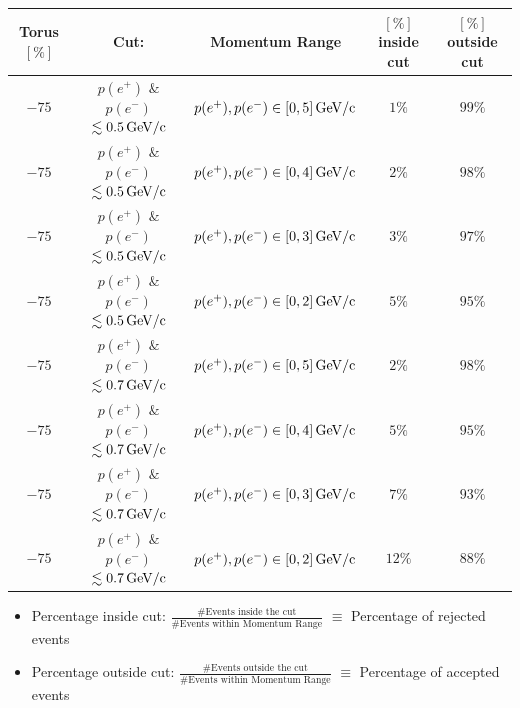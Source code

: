 \documentclass[xcolor=table, xcolor=dvipsnames]{beamer}
\begin{document}
\begin{frame}  
        \tiny
        \begin{table}
          \begin{tabular}{|c||c||c||c||c|}
             \hline
               Torus $[\%]$ & Cut: &  Momentum Range & $[\%]$ inside cut  & $[\%]$ outside cut \\
               \hline
               \hline
               $-75$ & $p(e^+)$ $\&$ $p(e^-)$ $ \lesssim 0.5\,\rm{GeV/c}$ & $p(e^+),p(e^-) \in [0,5] \,\rm{GeV/c}$  & $1\%$ & $99\%$\\
               \hline
                $-75$ & $p(e^+)$ $\&$ $p(e^-)$ $ \lesssim 0.5\,\rm{GeV/c}$ & $p(e^+),p(e^-) \in [0,4] \,\rm{GeV/c}$  & $2\%$ & $98\%$\\
                \hline
                 $-75$ & $p(e^+)$ $\&$ $p(e^-)$ $ \lesssim 0.5\,\rm{GeV/c}$ & $p(e^+),p(e^-) \in [0,3] \,\rm{GeV/c}$  & $3\%$ & $97\%$\\
                \hline
               $-75$ & $p(e^+)$ $\&$ $p(e^-)$ $ \lesssim 0.5\,\rm{GeV/c}$ & $p(e^+),p(e^-) \in [0,2] \,\rm{GeV/c}$  & $5\%$ & $95\%$\\
                \hline
                \hline
               $-75$ & $p(e^+)$ $\&$ $p(e^-)$ $ \lesssim 0.7\,\rm{GeV/c}$ & $p(e^+),p(e^-) \in [0,5] \,\rm{GeV/c}$  & $2\%$ & $98\%$\\
               \hline
                $-75$ & $p(e^+)$ $\&$ $p(e^-)$ $ \lesssim 0.7\,\rm{GeV/c}$ & $p(e^+),p(e^-) \in [0,4] \,\rm{GeV/c}$  & $5\%$ & $95\%$\\
                \hline
                 $-75$ & $p(e^+)$ $\&$ $p(e^-)$ $ \lesssim 0.7\,\rm{GeV/c}$ & $p(e^+),p(e^-) \in [0,3] \,\rm{GeV/c}$  & $7\%$ & $93\%$\\
                \hline
               $-75$ & $p(e^+)$ $\&$ $p(e^-)$ $ \lesssim 0.7\,\rm{GeV/c}$ & $p(e^+),p(e^-) \in [0,2] \,\rm{GeV/c}$  & $12\%$ & $88\%$\\
               \hline
               \hline
          \end{tabular}
        \end{table}  
		\begin{itemize}
	          \item Percentage inside cut: $\frac{\# \text{Events inside the cut}}{\# \text{Events within Momentum Range}}$ $\equiv$ Percentage of rejected events
			 \item Percentage outside cut: $\frac{\# \text{Events outside the cut}}{\# \text{Events within Momentum Range}}$ $\equiv$ Percentage of accepted events
	\end{itemize}        
\end{frame}
\end{document}
